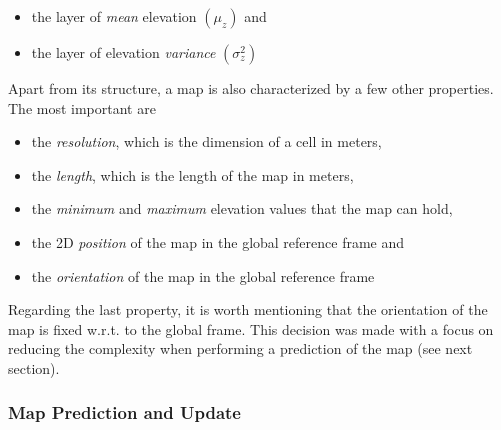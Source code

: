 \begin{itemize}
    \item the layer of \textit{mean} elevation $(\mu_z)$ and
    \item the layer of elevation \textit{variance} $(\sigma^2_z)$
\end{itemize}

Apart from its structure, a map is also characterized by a few other
properties.
The most important are

\begin{itemize}
    \item the \textit{resolution}, which is the dimension of a cell in meters,
    \item the \textit{length}, which is the length of the map in meters,
    \item the \textit{minimum} and \textit{maximum} elevation values that
        the map can hold,
    \item the 2D \textit{position} of the map in the global reference frame and
    \item the \textit{orientation} of the map in the global reference frame
\end{itemize}

Regarding the last property, it is worth mentioning that the orientation
of the map is fixed w.r.t. to the global frame.
This decision was made with a focus on reducing the complexity when performing
a prediction of the map (see next section).

\subsubsection{Map Prediction and Update} \label{map_prediction_and_update}

